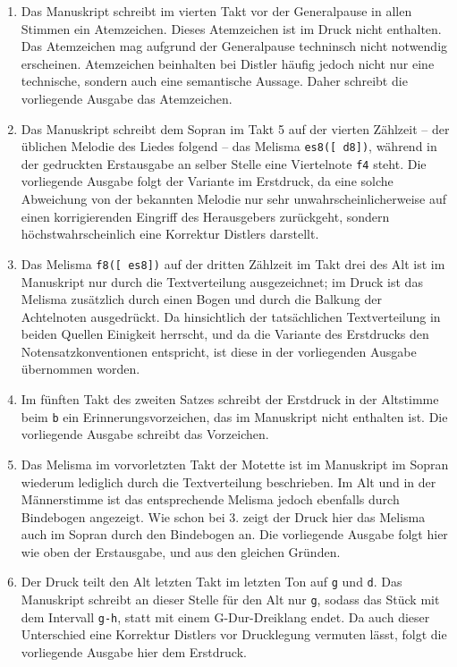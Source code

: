 \documentclass{book}
\begin{document}
\begin{multicols}{2}
\begin{enumerate}
\item
  Das Manuskript schreibt im vierten Takt vor der Generalpause in allen
  Stimmen ein Atemzeichen. Dieses Atemzeichen ist im Druck nicht
  enthalten. Das Atemzeichen mag aufgrund der Generalpause techninsch
  nicht notwendig erscheinen. Atemzeichen beinhalten bei Distler häufig
  jedoch nicht nur eine technische, sondern auch eine semantische
  Aussage. Daher schreibt die vorliegende Ausgabe das Atemzeichen.
\item
  Das Manuskript schreibt dem Sopran im Takt 5 auf der vierten Zählzeit
  -- der üblichen Melodie des Liedes folgend -- das Melisma
  \texttt{es\textquotesingle{}8({[}\ d\textquotesingle{}8{]})}, während
  in der gedruckten Erstausgabe an selber Stelle eine Viertelnote
  \texttt{f\textquotesingle{}4} steht. Die vorliegende Ausgabe folgt der
  Variante im Erstdruck, da eine solche Abweichung von der bekannten
  Melodie nur sehr unwahrscheinlicherweise auf einen korrigierenden
  Eingriff des Herausgebers zurückgeht, sondern höchstwahrscheinlich
  eine Korrektur Distlers darstellt.
\item
  Das Melisma \texttt{f8({[}\ es8{]})} auf der dritten Zählzeit im Takt
  drei des Alt ist im Manuskript nur durch die Textverteilung
  ausgezeichnet; im Druck ist das Melisma zusätzlich durch einen Bogen
  und durch die Balkung der Achtelnoten ausgedrückt. Da hinsichtlich der
  tatsächlichen Textverteilung in beiden Quellen Einigkeit herrscht, und
  da die Variante des Erstdrucks den Notensatzkonventionen entspricht,
  ist diese in der vorliegenden Ausgabe übernommen worden.
\item
  Im fünften Takt des zweiten Satzes schreibt der Erstdruck in der
  Altstimme beim \texttt{b} ein Erinnerungsvorzeichen, das im Manuskript
  nicht enthalten ist. Die vorliegende Ausgabe schreibt das Vorzeichen.
\item
  Das Melisma im vorvorletzten Takt der Motette ist im Manuskript im
  Sopran wiederum lediglich durch die Textverteilung beschrieben. Im Alt
  und in der Männerstimme ist das entsprechende Melisma jedoch ebenfalls
  durch Bindebogen angezeigt. Wie schon bei 3. zeigt der Druck hier das
  Melisma auch im Sopran durch den Bindebogen an. Die vorliegende
  Ausgabe folgt hier wie oben der Erstausgabe, und aus den gleichen
  Gründen.
\item
  Der Druck teilt den Alt letzten Takt im letzten Ton auf \texttt{g} und
  \texttt{d}. Das Manuskript schreibt an dieser Stelle für den Alt nur
  \texttt{g}, sodass das Stück mit dem Intervall \texttt{g-h}, statt mit
  einem G-Dur-Dreiklang endet. Da auch dieser Unterschied eine Korrektur
  Distlers vor Drucklegung vermuten lässt, folgt die vorliegende Ausgabe
  hier dem Erstdruck.
\end{enumerate}


\end{multicols}
\end{document}
